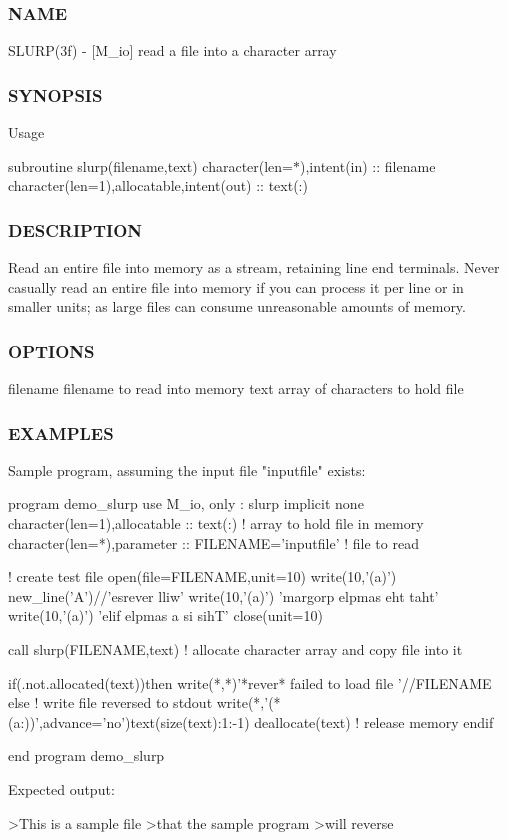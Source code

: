 \subsubsection*{N\+A\+ME}

S\+L\+U\+R\+P(3f) -\/ \mbox{[}M\+\_\+io\mbox{]} read a file into a character array \subsubsection*{S\+Y\+N\+O\+P\+S\+IS}

Usage

subroutine slurp(filename,text) character(len=$\ast$),intent(in) \+:\+: filename character(len=1),allocatable,intent(out) \+:\+: text(\+:) \subsubsection*{D\+E\+S\+C\+R\+I\+P\+T\+I\+ON}

Read an entire file into memory as a stream, retaining line end terminals. Never casually read an entire file into memory if you can process it per line or in smaller units; as large files can consume unreasonable amounts of memory. \subsubsection*{O\+P\+T\+I\+O\+NS}

filename filename to read into memory text array of characters to hold file \subsubsection*{E\+X\+A\+M\+P\+L\+ES}

\begin{DoxyVerb}Sample program, assuming the input file "inputfile" exists:

 program demo_slurp
 use M_io, only      : slurp
 implicit none
 character(len=1),allocatable :: text(:) ! array to hold file in memory
 character(len=*),parameter :: FILENAME='inputfile' ! file to read

 ! create test file
 open(file=FILENAME,unit=10)
 write(10,'(a)') new_line('A')//'esrever lliw'
 write(10,'(a)') 'margorp elpmas eht taht'
 write(10,'(a)') 'elif elpmas a si sihT'
 close(unit=10)

 call slurp(FILENAME,text) ! allocate character array and copy file into it

 if(.not.allocated(text))then
    write(*,*)'*rever* failed to load file '//FILENAME
 else
    ! write file reversed to stdout
    write(*,'(*(a:))',advance='no')text(size(text):1:-1)
    deallocate(text)  ! release memory
 endif

 end program demo_slurp

Expected output:

 >This is a sample file
 >that the sample program
 >will reverse \end{DoxyVerb}
 

